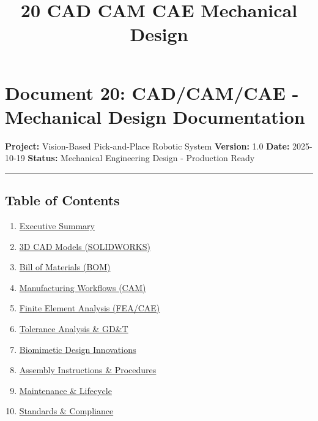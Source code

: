 \documentclass[
]{article}
\title{20 CAD CAM CAE Mechanical Design}
\author{}
\date{}
\providecommand{\tightlist}{%
  \setlength{\itemsep}{0pt}\setlength{\parskip}{0pt}}
\begin{document}
\maketitle

{
\setcounter{tocdepth}{3}
\tableofcontents
}
\hypertarget{document-20-cadcamcae---mechanical-design-documentation}{%
\section{Document 20: CAD/CAM/CAE - Mechanical Design
Documentation}\label{document-20-cadcamcae---mechanical-design-documentation}}

\textbf{Project:} Vision-Based Pick-and-Place Robotic System
\textbf{Version:} 1.0 \textbf{Date:} 2025-10-19 \textbf{Status:}
Mechanical Engineering Design - Production Ready

\begin{center}\rule{0.5\linewidth}{0.5pt}\end{center}

\hypertarget{table-of-contents}{%
\subsection{Table of Contents}\label{table-of-contents}}

\begin{enumerate}
\def\labelenumi{\arabic{enumi}.}
\tightlist
\item
  \protect\hyperlink{1-executive-summary}{Executive Summary}
\item
  \protect\hyperlink{2-3d-cad-models-solidworks}{3D CAD Models
  (SOLIDWORKS)}
\item
  \protect\hyperlink{3-bill-of-materials-bom}{Bill of Materials (BOM)}
\item
  \protect\hyperlink{4-manufacturing-workflows-cam}{Manufacturing
  Workflows (CAM)}
\item
  \protect\hyperlink{5-finite-element-analysis-feacae}{Finite Element
  Analysis (FEA/CAE)}
\item
  \protect\hyperlink{6-tolerance-analysis--gdt}{Tolerance Analysis \&
  GD\&T}
\item
  \protect\hyperlink{7-biomimetic-design-innovations}{Biomimetic Design
  Innovations}
\item
  \protect\hyperlink{8-assembly-instructions--procedures}{Assembly
  Instructions \& Procedures}
\item
  \protect\hyperlink{9-maintenance--lifecycle}{Maintenance \& Lifecycle}
\item
  \protect\hyperlink{10-standards--compliance}{Standards \& Compliance}
\end{enumerate}
\end{document}
